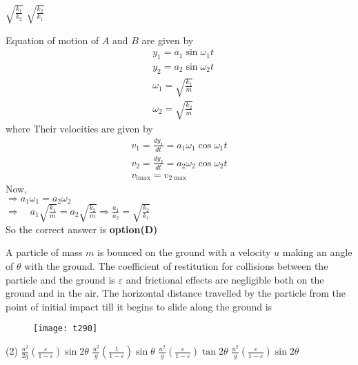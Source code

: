 \begin{questions}
\begin{tasks}
	\task[\textbf{C.}] $\sqrt{\frac{k_{1}}{k_{2}}}$
	\task[\textbf{D.}] $\sqrt{\frac{k_{2}}{k_{1}}}$
\end{tasks}
\begin{answer}
	Equation of motion of $A$ and $B$ are given by
	$$
	\begin{aligned}
	&y_{1}=a_{1} \sin \omega_{1} t \\
	&y_{2}=a_{2} \sin \omega_{2} t \\
	&\omega_{1}=\sqrt{\frac{k_{1}}{m}} \\
	&\omega_{2}=\sqrt{\frac{k_{2}}{m}}
	\end{aligned}
	$$
	where
	Their velocities are given by
	$$
	\begin{gathered}
	v_{1}=\frac{d y_{1}}{d t}=a_{1} \omega_{1} \cos \omega_{1} t \\
	v_{2}=\frac{d y_{2}}{d t}=a_{2} \omega_{2} \cos \omega_{2} t \\
	v_{\operatorname{lmax}}=v_{2 \max }
	\end{gathered}
	$$
	Now,\\
	$\Rightarrow a_{1} \omega_{1}=a_{2} \omega_{2}$\\
	$\Rightarrow \quad a_{1} \sqrt{\frac{k_{1}}{m}}=a_{2} \sqrt{\frac{k_{2}}{m}} \Rightarrow \frac{a_{1}}{a_{2}}=\sqrt{\frac{k_{2}}{k_{1}}}$\\
	So the correct answer is \textbf{option(D)}
\end{answer}
\begin{minipage}{\textwidth}
	\question A particle of mass $m$ is bounced on the ground with a velocity $u$ making an angle of $\theta$ with the ground. The coefficient of restitution for collisions between the particle and the ground is $\varepsilon$ and frictional effects are negligible both on the ground and in the air. The horizontal distance travelled by the particle from the point of initial impact till it begins to slide along the ground is
\end{minipage}
\begin{figure}[H]
	\centering
	\texttt{[image: t290]}
\end{figure}
\begin{tasks}(2)
	\task[\textbf{A.}] $\frac{u^{2}}{2 g}\left(\frac{\varepsilon}{1-\varepsilon}\right) \sin 2 \theta$
	\task[\textbf{B.}] $\frac{u^{2}}{g}\left(\frac{1}{1-\varepsilon}\right) \sin \theta$
	\task[\textbf{C.}] $\frac{u^{2}}{g}\left(\frac{\varepsilon}{1-\varepsilon}\right) \tan 2 \theta$
	\task[\textbf{D.}] $\frac{u^{2}}{g}\left(\frac{\varepsilon}{1-\varepsilon}\right) \sin 2 \theta$

\end{tasks}
\end{questions}
